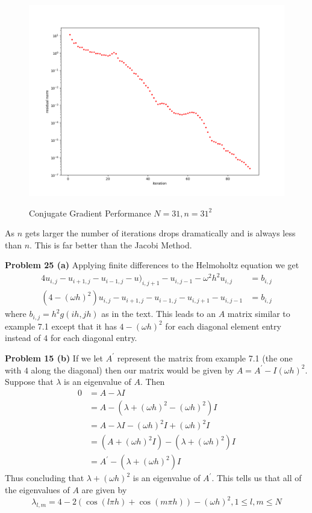 \documentclass[12pt]{article}
\newcommand{\problem}[1]{\hspace{-4 ex} \large \textbf{Problem #1} }
\begin{document}
\begin{figure}[H]
	\caption{Conjugate Gradient Performance $N=31, n=31^2$}
	\includegraphics[width=1\textwidth]{hwch7_figure_3_cg_N31_2}
	\label{13c}
	\centering
\end{figure}

As $n$ gets larger the number of iterations drops dramatically and is always less than $n$. This is far better than the Jacobi Method. 

\bigbreak

\problem{25 (a)} Applying finite differences to the Helmoholtz equation we get
\begin{align*}
	4u_{i,j} - u_{i+1,j} - u_{i-1,j} - u)_{i,j+1} - u_{i,j-1} - \omega^2 h^2 u_{i,j} & = b_{i,j} \\
	(4- (\omega h)^2)u_{i,j} - u_{i+1,j} - u_{i-1,j} - u_{i,j+1} - u_{i,j-1} & = b_{i,j}
\end{align*}
where $b_{i,j} = h^2g(ih,jh)$ as in the text. This leads to an $A$ matrix similar to example 7.1 except that it has $4-(\omega h)^2$ for each diagonal element entry instead of $4$ for each diagonal entry. \bigbreak

\bigbreak

\problem{15 (b)} If we let $A^\prime$ represent the matrix from example 7.1 (the one with $4$ along the diagonal) then our matrix would be given by $A = A^\prime- I(\omega h)^2$. Suppose that $\lambda$ is an eigenvalue of $A$. Then
\begin{align*}
	0 & = A - \lambda I \\
	& = A - (\lambda + (\omega h)^2 - (\omega h)^2)I \\
	& = A - \lambda I - (\omega h)^2I + (\omega h)^2I \\
	& = (A + (\omega h)^2I) - (\lambda + (\omega h)^2)I \\
	& = A^\prime - (\lambda + (\omega h)^2)I
\end{align*}
Thus concluding that $\lambda + (\omega h)^2$ is an eigenvalue of $A^\prime$. This tells us that all of the eigenvalues of $A$ are given by
$$
\lambda_{l,m} = 4 - 2(\cos(l \pi h) + \cos(m \pi h)) - (\omega h)^2, 1\leq l,m \leq N
$$
\end{document}
